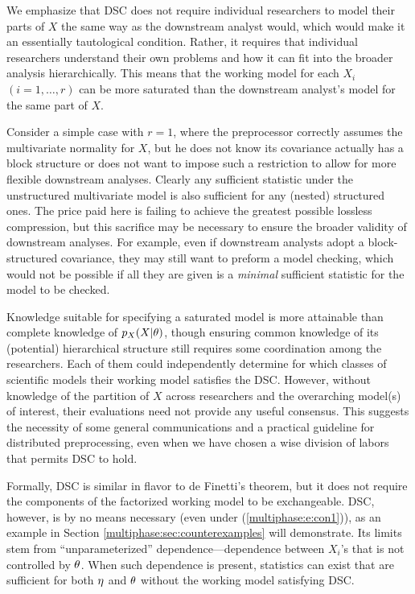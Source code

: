 %
We emphasize that DSC does not require individual researchers to model their parts of $X$ the same way as the downstream analyst would, which would make it an essentially tautological condition.
Rather, it requires that individual  researchers understand their own problems and how it can fit into the broader analysis hierarchically.
This means that the working model for each $X_i$ $(i=1,\ldots, r)$ can be more saturated than the downstream analyst's model for the same part of $X$.

Consider a simple case with $r=1$, where  the preprocessor correctly assumes the  multivariate normality for $X$, but he does not know its covariance actually has a block structure or does not want to impose such a restriction to allow for more flexible downstream analyses. 
Clearly any sufficient statistic under the unstructured multivariate model is also sufficient for any (nested) structured ones.
The price paid here is failing to achieve the greatest possible lossless compression, but this sacrifice may be necessary to ensure the broader validity of downstream analyses.
For example, even if  downstream analysts adopt a block-structured covariance, they  may still want to preform a model checking, which would not be possible if all they are given is a \textit{minimal}  sufficient statistic for the model to be checked.    


Knowledge suitable for specifying a saturated model is more attainable than complete knowledge of $p_X(X | \theta)$,  though ensuring common knowledge of its (potential) hierarchical structure  still requires some coordination among the researchers.
Each of them could independently determine for which classes of scientific models their working model satisfies the DSC.
However, without knowledge of the partition of $X$ across researchers and the overarching model(s) of interest, their evaluations need not provide  any useful consensus.
This suggests the necessity of some general communications and a practical guideline for distributed preprocessing, even when we have chosen a wise  division of labors that permits DSC to hold.

Formally, DSC is similar in flavor to de Finetti's theorem, but it does not require the components of the factorized working model to be exchangeable. 
DSC, however, is by no means necessary (even under (\ref{multiphase:e:con1})), as an example in Section \ref{multiphase:sec:counterexamples} will demonstrate.
Its limits stem from ``unparameterized'' dependence---dependence between $X_i$'s that is not controlled by $\theta$.
When such dependence is present, statistics can exist that are sufficient for both $\eta$ and $\theta$ without the working model satisfying DSC.


